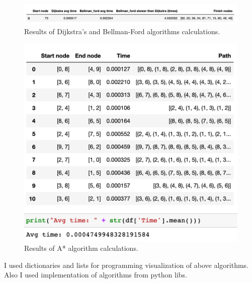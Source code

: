 \documentclass[a4paper,article,14pt]{extarticle}
\begin{document}
	\begin{figure}[h!]
		\centering
		\includegraphics[scale=0.5]{results_1.png}
		\caption{Results of Dijkstra's and Bellman-Ford algorithms calculations.}
		\label{graph}
	\end{figure}


	\begin{figure}[h!]
		\centering
		\includegraphics[scale=0.5]{results_2.png}
		\caption{Results of A* algorithm calculations.}
		\label{a}
	\end{figure} 
	
	I used dictionaries and lists for programming visualization of above algorithms. Also I used implementation of algorithms from python libs.

	
\end{document}

